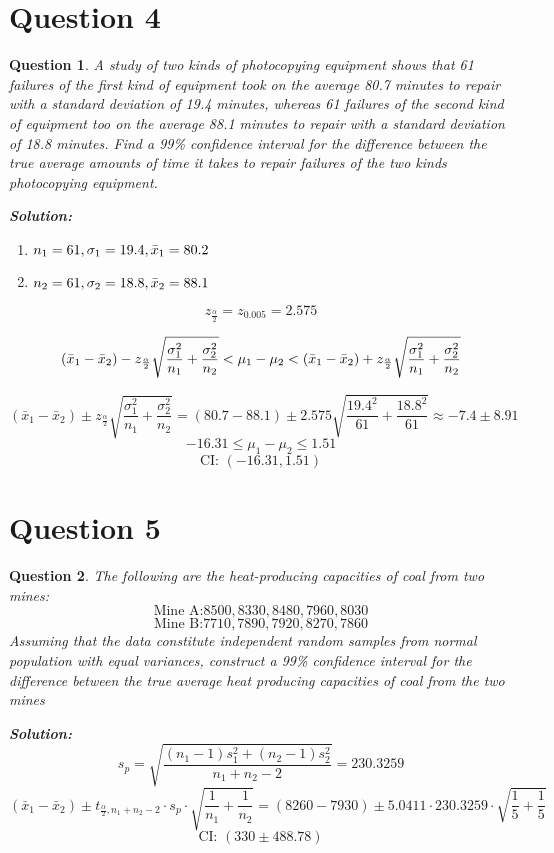 \documentclass{article}
\theoremstyle{questionstyle}
\newtheorem{myquestion}{Question}
\begin{document}
\section{Question 4}
\begin{myquestion}
 A study of two kinds of photocopying equipment shows that 61 failures of the first kind of equipment took on the average 80.7 minutes to repair with a standard deviation of 19.4 minutes, whereas 61 failures of the second kind of equipment too on the average 88.1 minutes to repair with a standard deviation of 18.8 minutes. Find a 99\% confidence interval for the difference between the true average amounts of time it takes to repair failures of the two kinds photocopying equipment.
    
\textbf{Solution:}\\
\begin{enumerate}
    \item \(n_1 = 61, \sigma_1 = 19.4, \Bar{x}_1 = 80.2\)
    \item \(n_2 = 61, \sigma_2 = 18.8, \Bar{x}_2 = 88.1\)
\end{enumerate}
\[z_{\frac{\alpha}{2}} = z_{0.005} = 2.575\]

\[(\Bar{x}_1 - \Bar{x}_2) - z_{\frac{\alpha}{2}}\sqrt{\frac{\sigma_1^2}{n_1} + \frac{\sigma_2^2}{n_2}} < \mu_1 - \mu_2 < (\Bar{x}_1 - \Bar{x}_2) + z_{\frac{\alpha}{2}}\sqrt{\frac{\sigma_1^2}{n_1} + \frac{\sigma_2^2}{n_2}}\]


\[
(\bar{x}_1 - \bar{x}_2) \pm z_{\frac{\alpha}{2}} \sqrt{\frac{\sigma_1^2}{n_1} + \frac{\sigma_2^2}{n_2}} = (80.7 - 88.1) \pm 2.575 \sqrt{\frac{19.4^2}{61} + \frac{18.8^2}{61}} \approx -7.4 \pm 8.91
\]
\[ -16.31 \leq \mu_1 - \mu_2 \leq 1.51 \]
\[
\text{CI: } (-16.31, 1.51)
\]

\end{myquestion}

\section{Question 5}
\begin{myquestion}
    The following are the heat-producing capacities of coal from two mines: 
    \[ \text{Mine A:} 8500, 8330, 8480, 7960, 8030 \]
    \[ \text{Mine B:} 7710, 7890, 7920, 8270, 7860 \]
    Assuming that the data constitute independent random samples from normal population with equal variances, construct a 99\% confidence interval for the difference between the true average heat producing capacities of coal from the two mines

\textbf{Solution:}\\
\[
s_p = \sqrt{\frac{(n_1 - 1)s_1^2 + (n_2 - 1)s_2^2}{n_1 + n_2 - 2}} = 230.3259
\]
\[
(\bar{x}_1 - \bar{x}_2) \pm t_{\frac{\alpha}{2}, n_1+n_2-2} \cdot s_p \cdot \sqrt{\frac{1}{n_1} + \frac{1}{n_2}} = (8260 - 7930) \pm 5.0411 \cdot 230.3259 \cdot \sqrt{\frac{1}{5} + \frac{1}{5}}
\]
\[
\text{CI: } (330 \pm 488.78)
\]
\end{myquestion}
\end{document}
